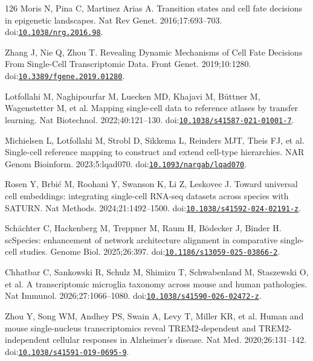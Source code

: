 \begin{thebibliography}{126}
Moris N, Pina C, Martinez Arias A. Transition states and cell fate decisions in epigenetic landscapes. Nat Rev Genet. 2016;17:693--703. doi:\href{https://doi.org/10.1038/nrg.2016.98}{\nolinkurl{10.1038/nrg.2016.98}}.

Zhang J, Nie Q, Zhou T. Revealing Dynamic Mechanisms of Cell Fate Decisions From Single-Cell Transcriptomic Data. Front Genet. 2019;10:1280. doi:\href{https://doi.org/10.3389/fgene.2019.01280}{\nolinkurl{10.3389/fgene.2019.01280}}.

Lotfollahi M, Naghipourfar M, Luecken MD, Khajavi M, Büttner M, Wagenstetter M, et al. Mapping single-cell data to reference atlases by transfer learning. Nat Biotechnol. 2022;40:121--130. doi:\href{https://doi.org/10.1038/s41587-021-01001-7}{\nolinkurl{10.1038/s41587-021-01001-7}}.

Michielsen L, Lotfollahi M, Strobl D, Sikkema L, Reinders MJT, Theis FJ, et al. Single-cell reference mapping to construct and extend cell-type hierarchies. NAR Genom Bioinform. 2023;5:lqad070. doi:\href{https://doi.org/10.1093/nargab/lqad070}{\nolinkurl{10.1093/nargab/lqad070}}.

Rosen Y, Brbić M, Roohani Y, Swanson K, Li Z, Leskovec J. Toward universal cell embeddings: integrating single-cell RNA-seq datasets across species with SATURN. Nat Methods. 2024;21:1492--1500. doi:\href{https://doi.org/10.1038/s41592-024-02191-z}{\nolinkurl{10.1038/s41592-024-02191-z}}.

Schächter C, Hackenberg M, Treppner M, Raum H, Bödecker J, Binder H. scSpecies: enhancement of network architecture alignment in comparative single-cell studies. Genome Biol. 2025;26:397. doi:\href{https://doi.org/10.1186/s13059-025-03866-2}{\nolinkurl{10.1186/s13059-025-03866-2}}.

Chhatbar C, Sankowski R, Schulz M, Shimizu T, Schwabenland M, Staszewski O, et al. A transcriptomic microglia taxonomy across mouse and human pathologies. Nat Immunol. 2026;27:1066--1080. doi:\href{https://doi.org/10.1038/s41590-026-02472-z}{\nolinkurl{10.1038/s41590-026-02472-z}}.

Zhou Y, Song WM, Andhey PS, Swain A, Levy T, Miller KR, et al. Human and mouse single-nucleus transcriptomics reveal TREM2-dependent and TREM2-independent cellular responses in Alzheimer's disease. Nat Med. 2020;26:131--142. doi:\href{https://doi.org/10.1038/s41591-019-0695-9}{\nolinkurl{10.1038/s41591-019-0695-9}}.


\end{thebibliography}
